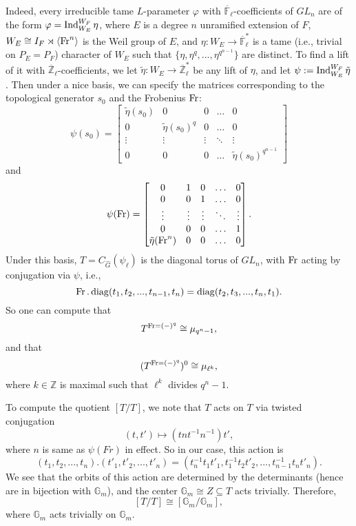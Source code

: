 Indeed, every irreducible tame $L$-parameter $\varphi$ with $\overline{\mathbb{F}}_{\ell}$-coefficients of $GL_n$ are of the form $\varphi=\operatorname{\operatorname{Ind}}_{W_E}^{W_F}\eta$, where $E$ is a degree $n$ unramified extension of $F$, $W_E \cong I_F \rtimes \left<\operatorname{Fr}^n\right>$ is the Weil group of $E$, and $\eta: W_E \to \overline{\mathbb{F}}_{\ell}^*$ is a tame (i.e., trivial on $P_E=P_F$) character of $W_E$ such that $\{\eta, \eta^q, ..., \eta^{q^{n-1}}\}$ are distinct. To find a lift of it with $\overline{\mathbb{Z}}_{\ell}$-coefficients, we let $\tilde{\eta}: W_E \to \overline{\mathbb{Z}}_{\ell}^*$ be any lift of $\eta$, and let $\psi:=\operatorname{\operatorname{Ind}}_{W_E}^{W_F}\tilde{\eta}$. Then under a nice basis, we can specify the matrices corresponding to the topological generator $s_0$ and the Frobenius $\operatorname{Fr}$:
$$\psi(s_0)=
\begin{bmatrix}\label{Matrices}
	\tilde{\eta}(s_0) & 0                   & 0      & \dots  & 0 \\
	0                 & \tilde{\eta}(s_0)^q & 0      & \dots  & 0 \\
	\vdots            & \vdots              & \vdots & \ddots & \vdots \\
	0                 & 0                   & 0      & \dots   & \tilde{\eta}(s_0)^{q^{n-1}}
\end{bmatrix}$$
and 
$$\psi(\operatorname{Fr})=
\begin{bmatrix}
	0                   & 1      & 0      & \dots  & 0 \\
	0                   & 0      & 1      & \dots  & 0 \\
	\vdots              & \vdots & \vdots & \ddots & \vdots \\
	0                   & 0      & 0      & \dots  & 1 \\
	\tilde{\eta}(\operatorname{Fr}^n) & 0      & 0      & \dots  & 0
\end{bmatrix}
.$$
Under this basis, $T=C_{\hat{G}}(\psi_{\ell})$ is the diagonal torus of $GL_n$, with $\operatorname{Fr}$ acting by conjugation via $\psi$, i.e., 
$$\operatorname{Fr}. \operatorname{\operatorname{diag}}(t_1, t_2, ..., t_{n-1}, t_{n}) = \operatorname{\operatorname{diag}}(t_{2}, t_{3}, ..., t_{n}, t_{1}).$$
So one can compute that 
$$T^{\operatorname{Fr}=(-)^q}\cong \mu_{q^n-1},$$
and that
$$(T^{\operatorname{Fr}=(-)^q})^0 \cong \mu_{\ell^k},$$
where $k \in \mathbb{Z}$ is maximal such that $\ell^k$ divides $q^n-1$.

To compute the quotient $[T/T]$, we note that $T$ acts on $T$ via twisted conjugation
$$(t, t') \mapsto (tnt^{-1}n^{-1})t',$$
where $n$ is same as $\psi(Fr)$ in effect. So in our case, this action is 
$$(t_1, t_2, ..., t_n).(t'_1, t'_2, ..., t'_n)=(t_n^{-1}t_1t'_1, t_1^{-1}t_2t'_2, ..., t_{n-1}^{-1}t_nt'_n).$$ 
We see that the orbits of this action are determined by the determinants (hence are in bijection with $\mathbb{G}_m$), and the center $\mathbb{G}_m \cong Z \subseteq T$ acts trivially. Therefore,
$$[T/T] \cong [\mathbb{G}_m/\mathbb{G}_m],$$
where $\mathbb{G}_m$ acts trivially on $\mathbb{G}_m$.

